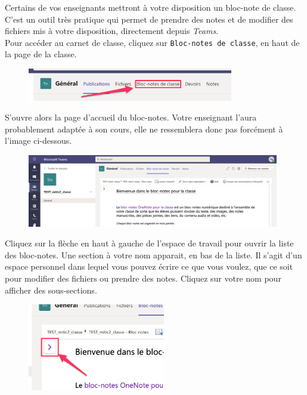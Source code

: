 Certains de vos enseignants mettront à votre disposition un bloc-note de classe. C'est un outil très pratique qui permet de prendre des notes et de modifier des fichiers mis à votre disposition, directement depuis \emph{Teams}.\\

Pour accéder au carnet de classe, cliquez sur \texttt{Bloc-notes de classe}, en haut de la page de la classe.

\begin{figure}[H]
	\includegraphics[width=9cm]{./images/teams/acces_bloc_notes_crop}
	\centering
\end{figure}

S'ouvre alors la page d'accueil du bloc-notes. Votre enseignant l'aura probablement adaptée à son cours, elle ne ressemblera donc pas forcément à l'image ci-dessous.

\begin{figure}[H]
	\includegraphics[width=11cm]{./images/teams/ouvrir_menu_bloc_notes_crop}
	\centering
\end{figure}

Cliquez sur la flèche en haut à gauche de l'espace de travail pour ouvrir la liste des bloc-notes. Une section à votre nom apparait, en bas de la liste. Il s'agit d'un espace personnel dans lequel vous pouvez écrire ce que vous voulez, que ce soit pour modifier des fichiers ou prendre des notes. Cliquez sur votre nom pour afficher des sous-sections.

\begin{figure}[H]
	\includegraphics[width=6cm]{./images/teams/ouvrir_liste_dossiers_docs_crop}
	\centering
\end{figure}

